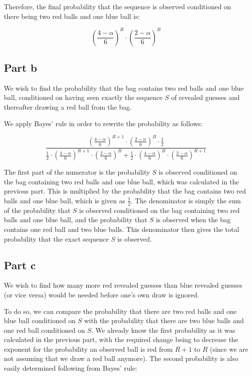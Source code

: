 \documentclass[12pt]{article}%
\begin{document}
Therefore, the final probability that the sequence is observed conditioned on there being two red balls and one blue ball is:

\begin{equation}
(\frac{4 - \alpha}{6})^R \cdot (\frac{2 - \alpha}{6})^B
\end{equation}

\subsection*{Part b}
We wish to find the probability that the bag contains two red balls and one blue ball, conditioned on having seen exactly the sequence $S$ of revealed guesses and thereafter drawing a red ball from the bag.

We apply Bayes' rule in order to rewrite the probability as follows:

\begin{equation}
\frac{(\frac{4 - \alpha}{6})^{R + 1} \cdot (\frac{2 - \alpha}{6})^B \cdot \frac{1}{2}}{\frac{1}{2} \cdot (\frac{4 - \alpha}{6})^{R + 1} \cdot (\frac{2 - \alpha}{6})^B + \frac{1}{2} \cdot (\frac{4 - \alpha}{6})^B \cdot (\frac{2 - \alpha}{6})^{R + 1}}
\end{equation}

The first part of the numerator is the probability $S$ is observed conditioned on the bag containing two red balls and one blue ball, which was calculated in the previous part. This is multiplied by the probability that the bag contains two red balls and one blue ball, which is given as $\frac{1}{2}$. The denominator is simply the sum of the probability that $S$ is observed conditioned on the bag containing two red balls and one blue ball, and the probability that $S$ is observed when the bag contains one red ball and two blue balls. This denominator then gives the total probability that the exact sequence $S$ is observed.

\subsection*{Part c}
We wish to find how many more red revealed guesses than blue revealed guesses (or vice versa) would be needed before one's own draw is ignored.

To do so, we can compare the probability that there are two red balls and one blue ball conditioned on $S$ with the probability that there are two blue balls and one red ball conditioned on $S$. We already know the first probability as it was calculated in the previous part, with the required change being to decrease the exponent for the probability an observed ball is red from $R + 1$ to $R$ (since we are not assuming that we draw a red ball anymore). The second probability is also easily determined following from Bayes' rule:
\end{document}
